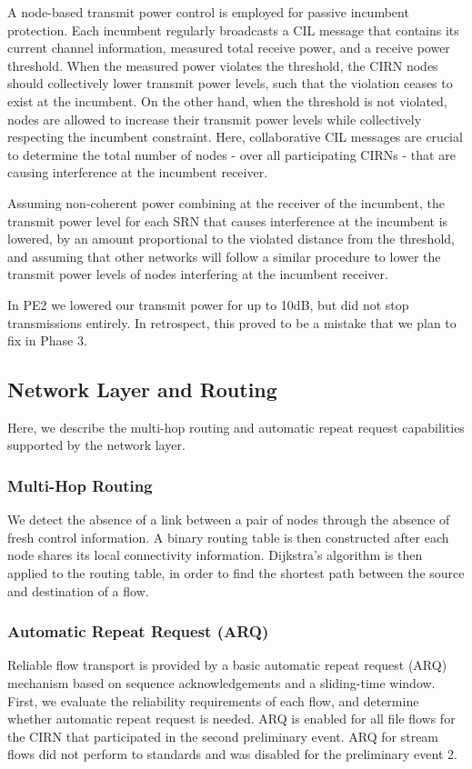 \documentclass[11pt]{article}
\begin{document}
A node-based transmit power control is employed for passive incumbent protection. Each incumbent regularly broadcasts a CIL message that contains its current channel information, measured total receive power, and a receive power threshold. When the measured power violates the threshold, the CIRN nodes should collectively lower transmit power levels, such that the violation ceases to exist at the incumbent. On the other hand, when the threshold is not violated, nodes are allowed to increase their transmit power levels while collectively respecting the incumbent constraint. Here, collaborative CIL messages are crucial to determine the total number of nodes - over all participating CIRNs - that are causing interference at the incumbent receiver.

Assuming non-coherent power combining at the receiver of the incumbent, the transmit power level for each SRN that causes interference at the incumbent is lowered, by an amount proportional to the violated distance from the threshold, and assuming that other networks will follow a similar procedure to lower the transmit power levels of nodes interfering at the incumbent receiver. 

In PE2 we lowered our transmit power for up to 10dB, but did not stop transmissions entirely. In retrospect, this proved to be a mistake that we plan to fix in Phase 3.


\subsection{Network Layer and Routing}
Here, we describe the multi-hop routing and automatic repeat request capabilities supported by the network layer.
\subsubsection{Multi-Hop Routing}
We detect the absence of a link between a pair of nodes through the absence of fresh control information. A binary routing table is then constructed after each node shares its local connectivity information. Dijkstra's algorithm is then applied to the routing table, in order to find the shortest path between the source and destination of a flow.
\subsubsection{Automatic Repeat Request (ARQ)}
Reliable flow transport is provided by a basic automatic repeat request (ARQ) mechanism based on sequence acknowledgements and a sliding-time window. First, we evaluate the reliability requirements of each flow, and determine whether automatic repeat request is needed. ARQ is enabled for all file flows for the CIRN that participated in the second preliminary event. ARQ for stream flows did not perform to standards and was disabled for the preliminary event 2.
\end{document}
